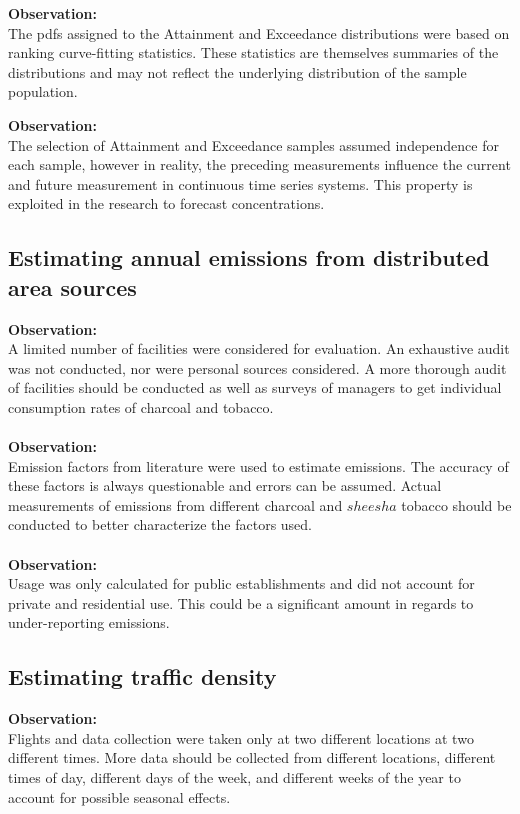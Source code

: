 \noindent
\textbf{Observation:}\\
The pdfs assigned to the Attainment and Exceedance distributions were based on ranking curve-fitting statistics. These statistics are themselves summaries of the distributions and may not reflect the underlying distribution of the sample population.

\noindent
\textbf{Observation:}\\
The selection of Attainment and Exceedance samples assumed independence for each sample, however in reality, the preceding measurements influence the current and future measurement in continuous time series systems. This property is exploited in the research to forecast concentrations.

\subsection*{Estimating annual emissions from distributed area sources}
\noindent
\textbf{Observation:}\\
A limited number of facilities were considered for evaluation. An exhaustive audit was not conducted, nor were personal sources considered. A more thorough audit of facilities should be conducted as well as surveys of managers to get individual consumption rates of charcoal and tobacco. \\

\noindent\\
\textbf{Observation:}\\
Emission factors from literature were used to estimate emissions. The accuracy of these factors is always questionable and errors can be assumed. Actual measurements of emissions from different charcoal and $sheesha$ tobacco should be conducted to better characterize the factors used.\\

\noindent\\
\textbf{Observation:}\\
Usage was only calculated for public establishments and did not account for private and residential use. This could be a significant amount in regards to under-reporting emissions.\\

\subsection*{Estimating traffic density}
\noindent
\textbf{Observation:}\\
Flights and data collection were taken only at two different locations at two different times. More data should be collected from different locations, different times of day,  different days of the week, and different weeks of the year to account for possible seasonal effects. \\

